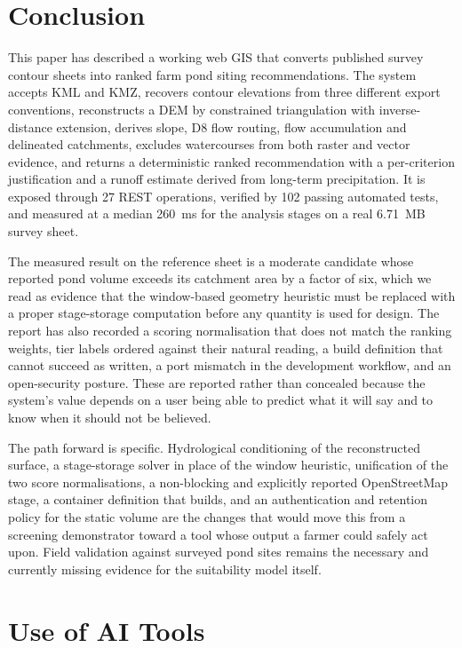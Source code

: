 \documentclass[sigconf,review,10pt]{acmart}
\begin{document}
\section{Conclusion}
\label{sec:conclusion}

This paper has described a working web GIS that converts published survey
contour sheets into ranked farm pond siting recommendations. The system
accepts KML and KMZ, recovers contour elevations from three different
export conventions, reconstructs a DEM by constrained triangulation with
inverse-distance extension, derives slope, D8 flow routing, flow
accumulation and delineated catchments, excludes watercourses from both
raster and vector evidence, and returns a deterministic ranked
recommendation with a per-criterion justification and a runoff estimate
derived from long-term precipitation. It is exposed through 27 REST
operations, verified by 102 passing automated tests, and measured at a
median 260~ms for the analysis stages on a real 6.71~MB survey sheet.

The measured result on the reference sheet is a moderate candidate whose
reported pond volume exceeds its catchment area by a factor of six, which
we read as evidence that the window-based geometry heuristic must be
replaced with a proper stage-storage computation before any quantity is
used for design. The report has also recorded a scoring normalisation that
does not match the ranking weights, tier labels ordered against their
natural reading, a build definition that cannot succeed as written, a port
mismatch in the development workflow, and an open-security posture. These
are reported rather than concealed because the system's value depends on a
user being able to predict what it will say and to know when it should not
be believed.

The path forward is specific. Hydrological conditioning of the
reconstructed surface, a stage-storage solver in place of the window
heuristic, unification of the two score normalisations, a non-blocking and
explicitly reported OpenStreetMap stage, a container definition that
builds, and an authentication and retention policy for the static volume
are the changes that would move this from a screening demonstrator toward
a tool whose output a farmer could safely act upon. Field validation
against surveyed pond sites remains the necessary and currently missing
evidence for the suitability model itself.

\section*{Use of AI Tools}
\end{document}
